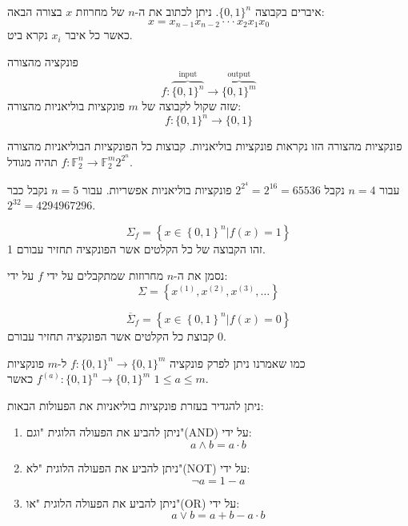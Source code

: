 \documentclass{tstextbook}
\begin{document}
\begin{definition}[מחרוזת]
איברים בקבוצה \(\{ 0,1 \}^{n}\). ניתן לכתוב את ה-\(n\) של מחרוזת \(x\) בצורה הבאה:
$$x=x_{n-1}x_{n-2}\cdot\cdot\cdot x_{2}x_{1}x_{0}$$
כאשר כל איבר \(x_{i}\) נקרא ביט.

\end{definition}
\begin{definition}[חישוב]
פונקציה מהצורה
$$f:\overbrace{ \{ 0,1 \}^{n} }^{ \text{input} }\to \overbrace{ \{ 0,1 \}^{m} }^{ \text{output} }$$
שזה שקול לקבוצה של \(m\) פונקציות בוליאניות מהצורה:
$$f:\{ 0,1 \}^{n}\to \{ 0,1 \}$$

\end{definition}
\begin{remark}
פונקציות מהצורה הזו נקראות פונקציות בוליאניות. קבוצות כל הפונקציות הבוליאניות מהצורה \(f:\mathbb{F} _{2}^{n}\to \mathbb{F} _{2}^{m}\) תהיה מגודל\(2^{2^{n}}\).

\end{remark}
\begin{example}
עבור \(n=4\) נקבל \(2^{2^{4}}=2^{16}=65536\) פונקציות בוליאניות אפשריות.
עבור \(n=5\) נקבל כבר \(2^{32}=4294967296\). 

\end{example}
\begin{definition}
$$\Sigma_{f}=\left\{x\in\left\{0,1\right\}^{n}|f\left(x\right)=1\right\}$$
זהו הקבוצה של כל הקלטים אשר הפונקציה תחזיר עבורם 1.

\end{definition}
\begin{symbolize}
נסמן את ה-\(n\) מחרוזות שמתקבלים על ידי \(f\) על ידי:
$$\Sigma=\left\{x^{(1)},x^{(2)},x^{(3)},\ldots\right\}$$

\end{symbolize}
\begin{definition}
$$\overline{{{\Sigma}}}_{f}=\left\{x\in\left\{0,1\right\}^{n}|f\left(x\right)=0\right\}$$
קבוצת כל הקלטים אשר הפונקציה תחזיר עבורם \(0\).

\end{definition}
\begin{symbolize}
כמו שאמרנו ניתן לפרק פונקציה \(f:{\{ 0,1 \}^{n}\to\{ 0,1 \}^{m}}\) ל-\(m\) פונקציות \(f^{(a)}:\{ 0,1 \}^{n}\to \{ 0,1 \}^{m}\) כאשר \(1\leq a \leq m\).

\end{symbolize}
\begin{proposition}
ניתן להגדיר בעזרת פונקציות בוליאניות את הפעולות הבאות:

  \begin{enumerate}
    \item ניתן להביע את הפעולה הלוגית "וגם"(AND) על ידי: 
$$a\land b = a\cdot b$$


    \item ניתן להביע את הפעולה הלוגית "לא"(NOT) על ידי: 
$$\lnot a = 1- a$$


    \item ניתן להביע את הפעולה הלוגית "או"(OR) על ידי: 
$$a\lor b = a+b - a\cdot b$$


  \end{enumerate}
\end{proposition}
\end{document}
